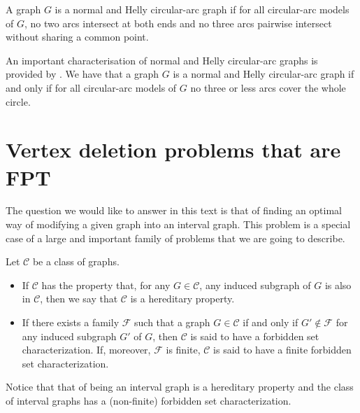 \documentclass{article}
\begin{document}
    \begin{defn}
        A graph $G$ is
        a normal and Helly circular-arc
        graph if for all
        circular-arc models
        of $G$,
        no two arcs intersect 
        at both ends and
        no three arcs 
        pairwise intersect without
        sharing a common point.
    \end{defn}

    An important characterisation
    of normal and Helly circular-arc
    graphs is provided by \cite{nor-Helly-char}.
    We have that a graph $G$ is a normal
    and Helly circular-arc graph
    if and only if for all
    circular-arc models of $G$ 
    no three or less arcs cover the
    whole circle.

    \section{Vertex deletion problems that are FPT}
    
    The question we would like to 
    answer in this text is that of
    finding an optimal way of modifying
    a given graph into an interval graph.
    This problem is a special case 
    of a large and important family of problems
    that we are going to describe.

    \begin{defn}
        Let $\mathcal{C}$ be a class of graphs.
        \begin{itemize}
            \item If $\mathcal{C}$ has the property that, for any $G \in \mathcal{C}$,
                any induced subgraph of $G$ is also in $\mathcal{C}$,
                then we say that $\mathcal{C}$ is a hereditary property.
            \item If there exists a family $\mathcal{F}$ such that
                a graph $G \in \mathcal{C}$ if and only if $G' \not \in \mathcal{F}$
                for any induced subgraph $G'$ of $G$, then $\mathcal{C}$ 
                is said to have a forbidden set characterization.
                If, moreover, $\mathcal{F}$ is finite, $\mathcal{C}$ is 
                said to have a finite forbidden set characterization.
        \end{itemize}
    \end{defn}

    Notice that that of being an interval graph
    is a hereditary property
    and the class of interval
    graphs has a (non-finite) forbidden
    set characterization.
        
\end{document}
